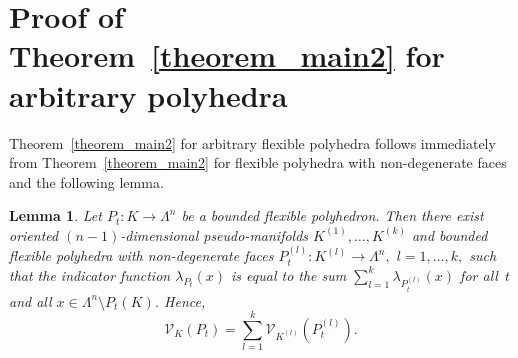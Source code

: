 \documentclass[reqno,tbtags,12pt]{amsart}
\numberwithin{equation}{section}
\newcommand{\CV}{\mathcal{V}}
\newtheorem{lem}[theorem]{Lemma}
\theoremstyle{definition}
\begin{document}
\section{Proof of Theorem~\ref{theorem_main2} for arbitrary polyhedra}\label{section_proof_main_arbitrary}


Theorem~\ref{theorem_main2} for arbitrary flexible polyhedra follows immediately from Theorem~\ref{theorem_main2} for flexible polyhedra with non-degenerate faces and the following lemma.

\begin{lem}\label{lem_degenerate}
Let $P_t\colon K\to\Lambda^n$ be a bounded flexible polyhedron. Then there exist oriented $(n-1)$-dimensional pseudo-manifolds $K^{(1)},\ldots,K^{(k)}$ and bounded flexible polyhedra with non-degenerate faces $P_t^{(l)}\colon K^{(l)}\to\Lambda^n,$ $l=1,\ldots,k,$  such that the indicator function $\lambda_{P_t}(x)$ is equal to the sum $\sum_{l=1}^k\lambda_{P_t^{(l)}}(x)$ for all~$t$ and all $x\in \Lambda^n\setminus P_t(K)$. Hence, $$\CV_K(P_t)=\sum_{l=1}^k\CV_{K^{(l)}}(P_t^{(l)}).$$
\end{lem}
\end{document}
